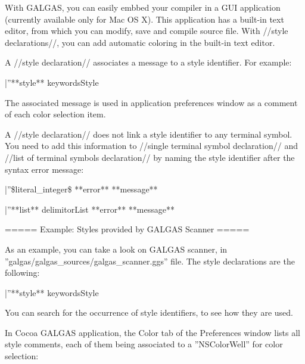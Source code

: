 With GALGAS, you can easily embbed your compiler in a GUI application (currently available only for Mac OS X). This application has a built-in text editor, from which you can modify, save and compile source file. With //style declarations//, you can add automatic coloring in the built-in text editor.

A //style declaration// associates a message to a style identifier. For example:

|''**style** keywordsStyle %

The associated message is used in application preferences window as a comment of each color selection item.

A //style declaration// does not link a style identifier to any terminal symbol. You need to add this information to //single terminal symbol declaration// and //list of terminal symbols declaration// by naming the style identifier after the syntax error message:

|''\$literal\_integer\$ **error** **message** %

|''**list** delimitorList **error** **message** %

===== Example: Styles provided by GALGAS Scanner =====

As an example, you can take a look on GALGAS scanner, in ''galgas/galgas\_sources/galgas\_scanner.ggs'' file. The style declarations are the following:

|''**style** keywordsStyle %

You can search for the occurrence of style identifiers, to see how they are used.

In Cocoa GALGAS application, the Color tab of the Preferences window lists all style comments, each of them being associated to a ''NSColorWell'' for color selection:

